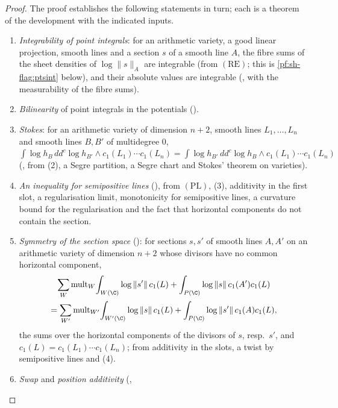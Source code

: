 \begin{proof}
The proof establishes the following statements in turn; each is a theorem of the development with the indicated inputs.
\begin{enumerate}[label=(\arabic*)]
\item \emph{Integrability of point integrals}: for an arithmetic variety, a good linear projection, smooth lines and a section $s$
of a smooth line $A$, the fibre sums of the sheet densities of $\log\|s\|_A$ are integrable (from $(\mathrm{RE})$; this is
\cref{pf:sh-flag:ptsint} below), and their absolute values are integrable
(, with the measurability of the fibre sums).
\item \emph{Bilinearity} of point integrals in the potentials ().
\item \emph{Stokes}: for an arithmetic variety of dimension $n+2$, smooth lines $L_1,\dots,L_n$ and smooth lines $B,B'$ of multidegree
$0$, $\int\log h_B\,dd^c\log h_{B'}\wedge c_1(L_1)\cdots c_1(L_n)=\int\log h_{B'}\,dd^c\log h_B\wedge c_1(L_1)\cdots c_1(L_n)$
(, from (2), a Segre partition, a Segre chart and Stokes'
theorem on varieties).
\item \emph{An inequality for semipositive lines} (), from $(\mathrm{PL})$,
(3), additivity in the first slot, a regularisation limit, monotonicity for semipositive lines, a curvature bound for the
regularisation and the fact that horizontal components do not contain the section.
\item \emph{Symmetry of the section space} (): for sections
$s,s'$ of smooth lines $A,A'$ on an arithmetic variety of dimension $n+2$ whose divisors have no common horizontal component,
\begin{multline*}
\sum_W\mathrm{mult}_W\!\int_{W(\C)}\log\|s'\|\,c_1(L)+\int_{P(\C)}\log\|s\|\,c_1(A')c_1(L)\\
=\sum_{W'}\mathrm{mult}_{W'}\!\int_{W'(\C)}\log\|s\|\,c_1(L)+\int_{P(\C)}\log\|s'\|\,c_1(A)c_1(L),
\end{multline*}
the sums over the horizontal components of the divisors of $s$, resp.\ $s'$, and $c_1(L)=c_1(L_1)\cdots c_1(L_n)$; from additivity in
the slots, a twist by semipositive lines and (4).
\item \emph{Swap} and \emph{position additivity} (,

\end{enumerate}
\end{proof}
